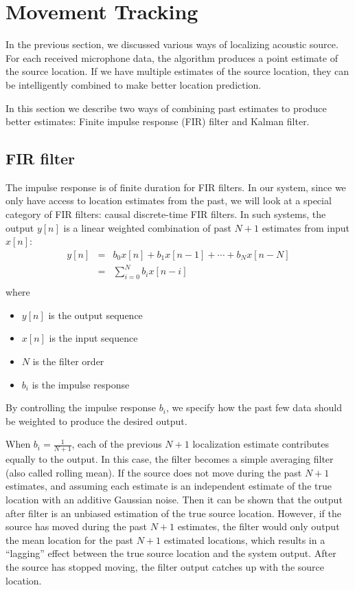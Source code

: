\section{Movement Tracking}
In the previous section, we discussed various ways of localizing acoustic source. For each received microphone data, the algorithm produces a point estimate of the source location. If we have multiple estimates of the source location, they can be intelligently combined to make better location prediction. 

In this section we describe two ways of combining past estimates to produce better estimates: Finite impulse response (FIR) filter and Kalman filter.

\subsection{FIR filter}
The impulse response is of finite duration for FIR filters. In our system, since we only have access to location estimates from the past, we will look at a special category of FIR filters: causal discrete-time FIR filters. In such systems, the output $y[n]$ is a linear weighted combination of past $N+1$ estimates from input $x[n]$:
\begin{eqnarray}
y[n] & = & b_0x[n] + b_1x[n-1] + \cdots + b_Nx[n-N]\\
& = & \sum_{i=0}^N b_i x[n-i]\\
\end{eqnarray}
where
\begin{itemize}
\item $y[n]$ is the output sequence
\item $x[n]$ is the input sequence
\item $N$ is the filter order
\item $b_i$ is the impulse response
\end{itemize}

By controlling the impulse response $b_i$, we specify how the past few data should be weighted to produce the desired output. 

When $b_i=\frac{1}{N+1}$, each of the previous $N+1$ localization estimate contributes equally to the output. In this case, the filter becomes a simple averaging filter (also called rolling mean). If the source does not move during the past $N+1$ estimates, and assuming each estimate is an independent estimate of the true location with an additive Gaussian noise. Then it can be shown that the output after filter is an unbiased estimation of the true source location. However, if the source has moved during the past $N+1$ estimates, the filter would only output the mean location for the past $N+1$ estimated locations, which results in a ``lagging'' effect between the true source location and the system output. After the source has stopped moving, the filter output catches up with the source location. 

